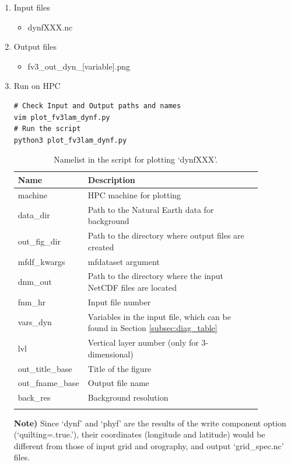 \documentclass[11pt,fleqn]{report}              %
\begin{document}
\begin{enumerate}
\item Input files
\begin{itemize}
\item dynfXXX.nc
\end{itemize}
\item Output files
\begin{itemize}
\item fv3\_out\_dyn\_[variable].png
\end{itemize}
\item Run on HPC

\lstset{language=bash}   
\begin{lstlisting}[frame=trBL]
# Check Input and Output paths and names
vim plot_fv3lam_dynf.py
# Run the script
python3 plot_fv3lam_dynf.py
\end{lstlisting}

{
\fontsize{10}{12}\selectfont
\begin{longtable}{p{0.17\linewidth} | p{0.7\linewidth} }
\hline
\hline
 Name & Description \\
\hline
 machine & HPC machine for plotting \\
 data\_dir & Path to the Natural Earth data for background \\
 out\_fig\_dir & Path to the directory where output files are created \\
 mfdf\_kwargs & mfdataset argument \\
 dnm\_out & Path to the directory where the input NetCDF files are located   \\
 fnm\_hr & Input file number \\
 vars\_dyn & Variables in the input file, which can be found in Section \ref{subsec:diag_table}\\
 lvl & Vertical layer number (only for 3-dimensional) \\
 out\_title\_base & Title of the figure \\
 out\_fname\_base & Output file name \\
 back\_res & Background resolution \\
\hline
\caption{Namelist in the script for plotting `dynfXXX'.}
\label{table:fv3_var_dyn}
\end{longtable}
}

{\bf Note)} Since `dynf' and `phyf' are the results of the write component option (`quilting=.true.'), their coordinates (longitude and latitude) would be different from those of input grid and orography, and output `grid\_spec.nc' files.



\end{enumerate}
\end{document}
